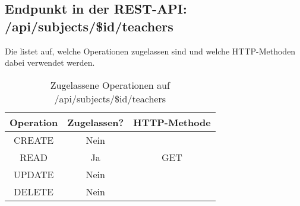 \subsection{Endpunkt in der REST-API: /api/subjects/\$id/teachers}
Die  listet auf, welche Operationen zugelassen sind und welche HTTP-Methoden dabei verwendet werden. 

\begin{table}[!htbp]
	\begin{tabular}{|c|c|c|}
		\hline
			\textbf{Operation} & \textbf{Zugelassen?} & \textbf{HTTP-Methode} \\ \hline
			CREATE & Nein & \\ \hline 
			READ & Ja & GET \\ \hline
			UPDATE & Nein & \\ \hline 
			DELETE & Nein & \\ \hline
	\end{tabular}

		\caption{Zugelassene Operationen auf /api/subjects/\$id/teachers}
		\label{tab:rest:api:subjects:id:teachers:meth}
\end{table}

